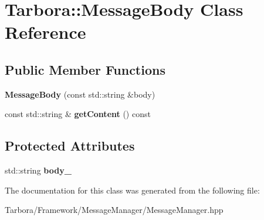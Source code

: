 \hypertarget{classTarbora_1_1MessageBody}{}\section{Tarbora\+:\+:Message\+Body Class Reference}
\label{classTarbora_1_1MessageBody}
\subsection*{Public Member Functions}
\begin{DoxyCompactItemize}
\item 
\mbox{\label{classTarbora_1_1MessageBody_a6e719ae55e020020531b51243999fe1f}} 
{\bfseries Message\+Body} (const std\+::string \&body)
\item 
\mbox{\label{classTarbora_1_1MessageBody_a3c437f659cc409d12971a00b310dd690}} 
const std\+::string \& {\bfseries get\+Content} () const
\end{DoxyCompactItemize}
\subsection*{Protected Attributes}
\begin{DoxyCompactItemize}
\item 
\mbox{\label{classTarbora_1_1MessageBody_ab59f021e75e652d11bf053af9f6150c0}} 
std\+::string {\bfseries body\+\_\+}
\end{DoxyCompactItemize}


The documentation for this class was generated from the following file\+:\begin{DoxyCompactItemize}
\item 
Tarbora/\+Framework/\+Message\+Manager/Message\+Manager.\+hpp\end{DoxyCompactItemize}
